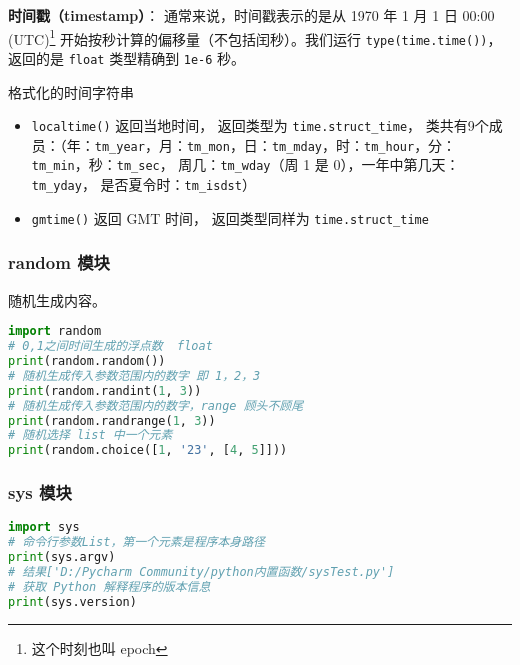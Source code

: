 \textbf{时间戳（timestamp）}： 通常来说，时间戳表示的是从 1970 年 1 月 1 日 00:00 (UTC)\footnote{这个时刻也叫 epoch} 开始按秒计算的偏移量（不包括闰秒）。我们运行 \verb`type(time.time())`， 返回的是 \verb`float` 类型精确到 \verb`1e-6` 秒。

格式化的时间字符串
\begin{itemize}
\item \verb`localtime()` 返回当地时间， 返回类型为 \verb`time.struct_time`， 类共有9个成员：（年：\verb`tm_year`，月：\verb`tm_mon`，日：\verb`tm_mday`，时：\verb`tm_hour`，分：\verb`tm_min`，秒：\verb`tm_sec`， 周几：\verb`tm_wday`（周 1 是 0），一年中第几天：\verb`tm_yday`， 是否夏令时：\verb`tm_isdst`）
\item \verb`gmtime()` 返回 GMT 时间， 返回类型同样为 \verb`time.struct_time`
\end{itemize}

\subsubsection{random 模块}
随机生成内容。
\begin{lstlisting}[language=python]
import random
# 0,1之间时间生成的浮点数  float
print(random.random())
# 随机生成传入参数范围内的数字 即 1，2，3
print(random.randint(1, 3))
# 随机生成传入参数范围内的数字，range 顾头不顾尾
print(random.randrange(1, 3))
# 随机选择 list 中一个元素
print(random.choice([1, '23', [4, 5]]))
\end{lstlisting}

\subsubsection{sys 模块}
\begin{lstlisting}[language=python]
import sys
# 命令行参数List，第一个元素是程序本身路径
print(sys.argv)
# 结果['D:/Pycharm Community/python内置函数/sysTest.py']
# 获取 Python 解释程序的版本信息
print(sys.version)
\end{lstlisting}

